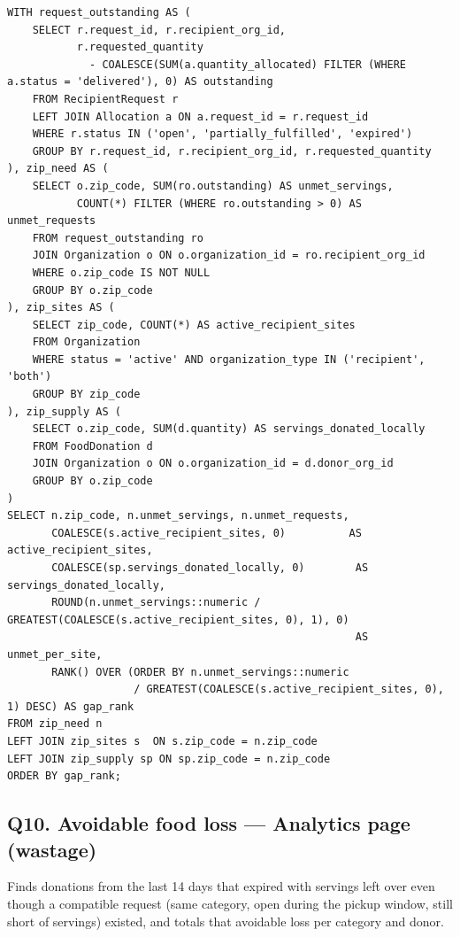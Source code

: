 \documentclass[11pt,letterpaper]{article}
\begin{document}
\begin{lstlisting}
WITH request_outstanding AS (
    SELECT r.request_id, r.recipient_org_id,
           r.requested_quantity
             - COALESCE(SUM(a.quantity_allocated) FILTER (WHERE a.status = 'delivered'), 0) AS outstanding
    FROM RecipientRequest r
    LEFT JOIN Allocation a ON a.request_id = r.request_id
    WHERE r.status IN ('open', 'partially_fulfilled', 'expired')
    GROUP BY r.request_id, r.recipient_org_id, r.requested_quantity
), zip_need AS (
    SELECT o.zip_code, SUM(ro.outstanding) AS unmet_servings,
           COUNT(*) FILTER (WHERE ro.outstanding > 0) AS unmet_requests
    FROM request_outstanding ro
    JOIN Organization o ON o.organization_id = ro.recipient_org_id
    WHERE o.zip_code IS NOT NULL
    GROUP BY o.zip_code
), zip_sites AS (
    SELECT zip_code, COUNT(*) AS active_recipient_sites
    FROM Organization
    WHERE status = 'active' AND organization_type IN ('recipient', 'both')
    GROUP BY zip_code
), zip_supply AS (
    SELECT o.zip_code, SUM(d.quantity) AS servings_donated_locally
    FROM FoodDonation d
    JOIN Organization o ON o.organization_id = d.donor_org_id
    GROUP BY o.zip_code
)
SELECT n.zip_code, n.unmet_servings, n.unmet_requests,
       COALESCE(s.active_recipient_sites, 0)          AS active_recipient_sites,
       COALESCE(sp.servings_donated_locally, 0)        AS servings_donated_locally,
       ROUND(n.unmet_servings::numeric / GREATEST(COALESCE(s.active_recipient_sites, 0), 1), 0)
                                                       AS unmet_per_site,
       RANK() OVER (ORDER BY n.unmet_servings::numeric
                    / GREATEST(COALESCE(s.active_recipient_sites, 0), 1) DESC) AS gap_rank
FROM zip_need n
LEFT JOIN zip_sites s  ON s.zip_code = n.zip_code
LEFT JOIN zip_supply sp ON sp.zip_code = n.zip_code
ORDER BY gap_rank;
\end{lstlisting}

\subsection*{Q10. Avoidable food loss --- Analytics page (wastage)}
Finds donations from the last 14 days that expired with servings left over even though a compatible request (same category, open during the pickup window, still short of servings) existed, and totals that avoidable loss per category and donor.
\end{document}
